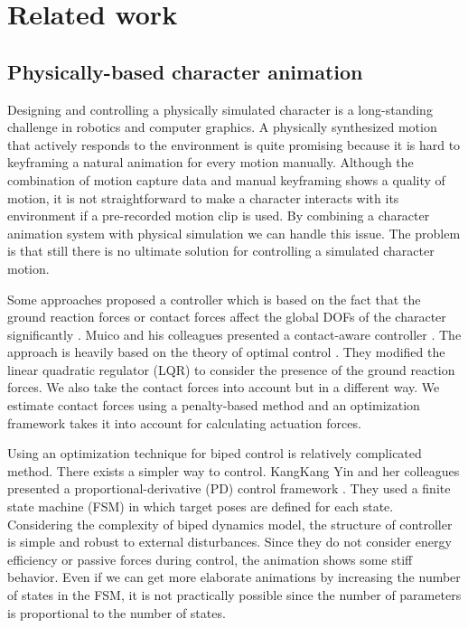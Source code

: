 \documentclass[master,english,final]{kaist-ucs}
\begin{document}
\chapter{Related work}

\section{Physically-based character animation}
Designing and controlling a physically simulated character is a long-standing
challenge in robotics and computer graphics. A physically
synthesized motion that actively responds to the environment is quite
promising because it is hard to keyframing a natural animation for every motion
manually. Although the combination of motion capture data and manual keyframing
shows a quality of motion, it is not straightforward to make a character
interacts with its environment if a pre-recorded motion clip is used.
By combining  a character animation system with physical simulation we can handle
this issue. The problem is that still there is no ultimate solution for controlling
a simulated character motion.

Some approaches proposed a controller which is based on the fact
that the ground reaction forces or contact forces affect the global
DOFs of the character significantly \cite{SCA07:249-258:2007, journals/tog/MuicoLPP09}.
Muico and his colleagues
presented a contact-aware controller \cite{journals/tog/MuicoLPP09}.
The approach is
heavily based on the theory of optimal control \cite{lewis}.
They modified the linear quadratic regulator (LQR) to consider the presence of the ground reaction forces.
We also take the contact forces into account but in a different way.
We estimate contact forces using a penalty-based method and an optimization framework
takes it into account for calculating actuation forces.

Using an optimization technique for biped control is relatively complicated method.
There exists a simpler way to control. KangKang Yin and her colleagues
presented a proportional-derivative (PD) control framework \cite{journals/tog/YinLP07}.
They used a finite state machine (FSM) in which target poses are defined
for each state. Considering the complexity of biped dynamics model,
the structure of controller is simple and robust to external disturbances.
Since they do not consider energy efficiency or passive forces during
control, the animation shows some stiff behavior.
Even if we can get more elaborate animations by increasing
the number of states in the FSM, it is not practically possible since the
number of parameters is proportional to the number of states.
\end{document}
